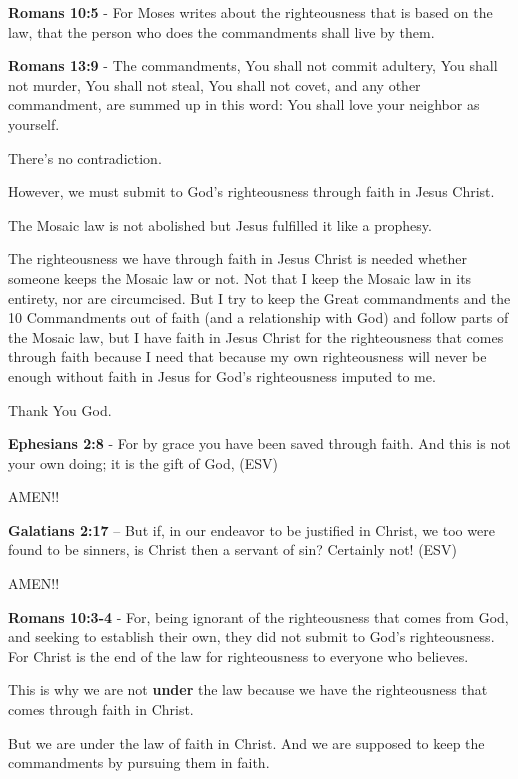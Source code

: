 \documentclass[11pt]{article}
\begin{document}
\textbf{Romans 10:5} - For Moses writes about the righteousness that is based on the law, that the person who does the commandments shall live by them.

\textbf{Romans 13:9} - The commandments, You shall not commit adultery, You shall not murder, You shall not steal, You shall not covet, and any other commandment, are summed up in this word: You shall love your neighbor as yourself.

There's no contradiction.

However, we must submit to God's righteousness through faith in Jesus Christ.

The Mosaic law is not abolished but Jesus fulfilled it like a prophesy.

The righteousness we have through faith in Jesus Christ is needed whether someone keeps the Mosaic law or not.
Not that I keep the Mosaic law in its entirety, nor are circumcised. But I try to keep the Great commandments
and the 10 Commandments out of faith (and a relationship with God) and follow parts of the Mosaic law,
but I have faith in Jesus Christ for the righteousness that comes through faith because I need that because my own
righteousness will never be enough without faith in Jesus for God's righteousness imputed to me.

Thank You God.

\textbf{Ephesians 2:8} -  For by grace you have been saved through faith.  And this is not your own doing; it is the gift of God,  (ESV)

AMEN!!

\textbf{Galatians 2:17} -- But if, in our endeavor to be justified in Christ, we too were found to be sinners, is Christ then a servant of sin? Certainly not! (ESV)

AMEN!!

\textbf{Romans 10:3-4} - For, being ignorant of the righteousness that comes from God, and seeking to establish their own, they did not submit to God's righteousness. For Christ is the end of the law for righteousness to everyone who believes.

This is why we are not \textbf{under} the law because we have the righteousness that comes through faith in Christ.

But we are under the law of faith in Christ.
And we are supposed to keep the commandments by pursuing them in faith.
\end{document}
